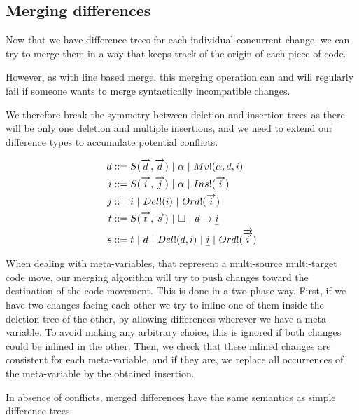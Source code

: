 \documentclass[a4paper,11pt]{article}
\newcommand\typsep{\ |\ }
\newcommand\mathst[1]{\text{\st{$#1$}}}
\newcommand\mathul[1]{\text{\ul{$#1$}}}
\newcommand\id{\square}
\newcommand\change[2]{\mathst{#1} \rightarrow \mathul{#2}}
\begin{document}
\subsection{Merging differences}
Now that we have difference trees for each individual concurrent change, we can try to merge them in a way that keeps track of the origin of each piece of code.

However, as with line based merge, this merging operation can and will regularly fail if someone wants to merge syntactically incompatible changes.

We therefore break the symmetry between deletion and insertion trees as there will be only one deletion and multiple insertions, and we need to extend our difference types to accumulate potential conflicts.

\begin{align*}
d &::= S(\overrightarrow{d}, \overrightarrow{d}) \typsep \alpha \typsep Mv!(\alpha, d, i) \\
i &::= S(\overrightarrow{i}, \overrightarrow{j}) \typsep \alpha \typsep Ins!(\overrightarrow{i})\\
j &::= i \typsep Del!(i) \typsep Ord!(\overrightarrow{i})\\
t &::= S(\overrightarrow{t}, \overrightarrow{s}) \typsep \id \typsep  \change{d}{i}\\
s &::= t \typsep \mathst{d} \typsep Del!(d, i) \typsep \mathul{i} \typsep Ord!(\overrightarrow{\overrightarrow{i}})\\
\end{align*}

When dealing with meta-variables, that represent a multi-source multi-target code move, our merging algorithm will try to push changes toward the destination of the code movement.
This is done in a two-phase way. First, if we have two changes facing each other we try to inline one of them inside the deletion tree of the other, by allowing differences wherever we have a meta-variable. To avoid making any arbitrary choice, this is ignored if both changes could be inlined in the other. Then, we check that these inlined changes are consistent for each meta-variable, and if they are, we replace all occurrences of the meta-variable by the obtained insertion.

In absence of conflicts, merged differences have the same semantics as simple difference trees.
\end{document}
